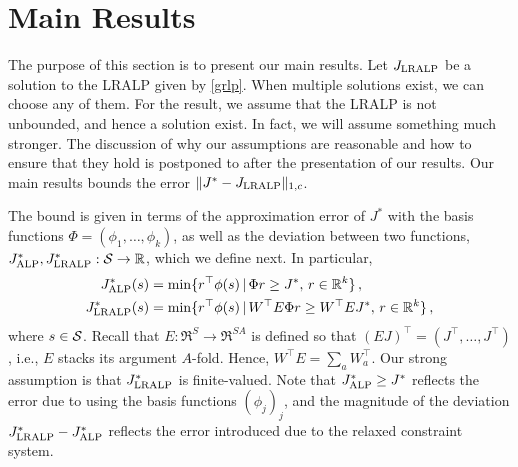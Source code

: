 \section{Main Results}


The purpose of this section is to present our main results.
\newcommand{\Jalpo}{J^*_{\alp}}
\newcommand{\Jlro}{J^*_{\lralp}}
\newcommand{\Jlr}{J_{\lralp}}
Let $\Jlr$ be a solution to the LRALP given by \eqref{grlp}. When multiple solutions exist, we can choose any of them.
For the result, we assume that the LRALP is not unbounded, and hence a solution exist. In fact, we will assume something much stronger. The discussion of why our assumptions are reasonable and how to ensure that they hold is postponed to after the presentation of our results.
Our main results bounds the error $\norm{J^* - \Jlr}_{1,c}$.

The bound is given in terms of the approximation error of $J^*$ with the basis functions $\Phi= (\phi_1,\dots,\phi_k)$, as well as the deviation between two functions, $\Jalpo,\Jlro: \S \to \Re$, which we define next. In particular,
\begin{align*}
\Jalpo(s) & = \min\{ r^\top\phi(s) \,|\, \Phi r \ge J^*, \, r\in \Re^k \}\,,\\
\Jlro(s)    & = \min\{ r^\top\phi(s) \,|\, W^\top E \Phi r \ge W^\top E J^*, \, r\in \Re^k \}\,,
\end{align*}
where $s\in \S$. Recall that $E: \Re^S \to \Re^{SA}$ is defined so that $(E J)^\top = (J^\top, \dots, J^\top)$, i.e., $E$ stacks its argument $A$-fold. Hence, $W^\top E = \sum_a W_a^\top$. Our strong assumption is that $\Jlro$ is finite-valued. Note that $\Jalpo\ge J^*$ reflects the error due to using the basis functions $(\phi_j)_j$, and the magnitude of the deviation $\Jlro-\Jalpo$ reflects the error introduced due to the relaxed constraint system. 

